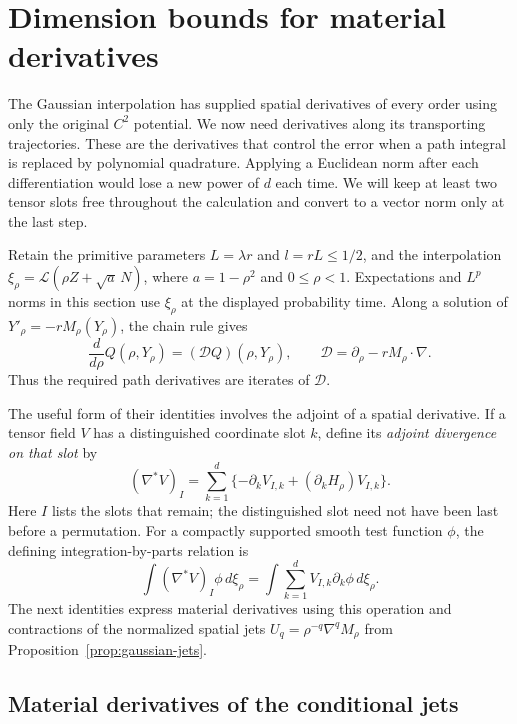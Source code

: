 \section{Dimension bounds for material derivatives}
\label{sec:divergence}

The Gaussian interpolation has supplied spatial derivatives of every
order using only the original $C^2$ potential.  We now need derivatives
along its transporting trajectories.  These are the derivatives that
control the error when a path integral is replaced by polynomial
quadrature.  Applying a Euclidean norm after each differentiation would
lose a new power of $d$ each time.  We will keep at least two tensor
slots free throughout the calculation and convert to a vector norm
only at the last step.

Retain the primitive parameters $L=\lambda r$ and $l=rL\le1/2$,
and the interpolation
$\xi_\rho=\mathcal L(\rho Z+\sqrt a\,N)$, where
$a=1-\rho^2$ and $0\le\rho<1$.  Expectations and $L^p$ norms in
this section use $\xi_\rho$ at the displayed probability time.  Along
a solution of $Y'_\rho=-rM_\rho(Y_\rho)$, the chain rule gives
\[
 \frac d{d\rho}Q(\rho,Y_\rho)
   =(\mathcal DQ)(\rho,Y_\rho),\qquad
 \mathcal D=\partial_\rho-rM_\rho\cdot\nabla.
\]
Thus the required path derivatives are iterates of $\mathcal D$.

The useful form of their identities involves the adjoint of a spatial
derivative.  If a tensor field $V$ has a distinguished coordinate slot
$k$, define its \emph{adjoint divergence on that slot} by
\[
 (\nabla^*V)_I
 =\sum_{k=1}^d\{-\partial_kV_{I,k}
                    +(\partial_kH_\rho)V_{I,k}\}.
\]
Here $I$ lists the slots that remain; the distinguished slot need not
have been last before a permutation.  For a compactly supported smooth
test function $\phi$, the defining integration-by-parts relation is
\[
 \int(\nabla^*V)_I\phi\,d\xi_\rho
   =\int\sum_{k=1}^dV_{I,k}\partial_k\phi\,d\xi_\rho.
\]
The next identities express material derivatives using this operation
and contractions of the normalized spatial jets
$U_q=\rho^{-q}\nabla^qM_\rho$ from
Proposition~\ref{prop:gaussian-jets}.

\subsection{Material derivatives of the conditional jets}

